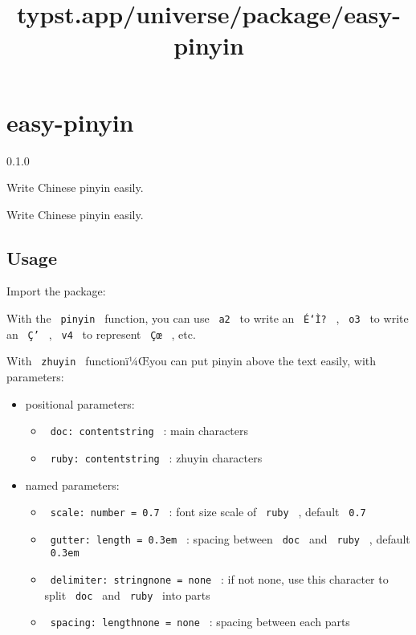 \title{typst.app/universe/package/easy-pinyin}

\label{banner}
\section{easy-pinyin}\label{easy-pinyin}

{ 0.1.0 }

Write Chinese pinyin easily.

\label{readme}
Write Chinese pinyin easily.

\subsection{Usage}\label{usage}

Import the package:

\begin{Shaded}
\begin{Highlighting}[]
\end{Highlighting}
\end{Shaded}

With the \texttt{\ pinyin\ } function, you can use \texttt{\ a2\ } to
write an \texttt{\ É‘Ì?\ } , \texttt{\ o3\ } to write an \texttt{\ Ç’\ }
, \texttt{\ v4\ } to represent \texttt{\ Çœ\ } , etc.

With \texttt{\ zhuyin\ } functionï¼Œyou can put pinyin above the text
easily, with parameters:

\begin{itemize}
\tightlist
\item
  positional parameters:

  \begin{itemize}
  \tightlist
  \item
    \texttt{\ doc:\ content\textbar{}string\ } : main characters
  \item
    \texttt{\ ruby:\ content\textbar{}string\ } : zhuyin characters
  \end{itemize}
\item
  named parameters:

  \begin{itemize}
  \tightlist
  \item
    \texttt{\ scale:\ number\ =\ 0.7\ } : font size scale of
    \texttt{\ ruby\ } , default \texttt{\ 0.7\ }
  \item
    \texttt{\ gutter:\ length\ =\ 0.3em\ } : spacing between
    \texttt{\ doc\ } and \texttt{\ ruby\ } , default \texttt{\ 0.3em\ }
  \item
    \texttt{\ delimiter:\ string\textbar{}none\ =\ none\ } : if not
    none, use this character to split \texttt{\ doc\ } and
    \texttt{\ ruby\ } into parts
  \item
    \texttt{\ spacing:\ length\textbar{}none\ =\ none\ } : spacing
    between each parts
  \end{itemize}
\end{itemize}

